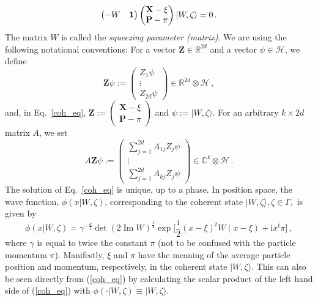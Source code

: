 \documentclass[11pt]{article}
\renewcommand{\Im}{\operatorname{Im}}
\newcommand{\iu}{{\mathrm i}}
\newcommand{\id}{\mathrm{id}}
\begin{document}
\begin{equation}\label{coh_eq}
\begin{pmatrix}
-W & {\bf{1}} \end{pmatrix}
\begin{pmatrix}
\mathbf{X}  -\xi \\
\mathbf{P}  -\pi \end{pmatrix} \vert W, \zeta \rangle = 0\,.
\end{equation}
The matrix $W$ is called the \textit{squeezing parameter (matrix)}. We are using the following notational conventions: For a vector $\mathbf{Z} \in \mathbb{R}^{2d}$ and a vector $\psi \in \mathcal{H}$, we
define 
$$\mathbf{Z} \psi:= \begin{pmatrix} Z_1 \psi \\ \vdots \\ Z_{2d} \psi \end{pmatrix} \in \mathbb{R}^{2d} \otimes \mathcal{H}\,,$$
and, in Eq.~\eqref{coh_eq}, $\mathbf{Z} := \begin{pmatrix} \mathbf{X}-\xi \\ \mathbf{P}- \pi \end{pmatrix}$ and 
$\psi:= \vert W, \zeta\rangle$. For an arbitrary $k\times 2d$ matrix $A$, we set
$$A \mathbf{Z} \psi:= \begin{pmatrix} \sum_{j=1}^{2d} A_{1j} Z_j \psi \\ \vdots \\ \sum_{j=1}^{2d} A_{kj} Z_j \psi \end{pmatrix} \in \mathbb{C}^{k} \otimes \mathcal{H}\,.$$
The solution of Eq.~\eqref{coh_eq} is unique, up to a phase. In position space, the wave function, $\phi(x \vert W, \zeta)$, corresponding to the coherent state $\vert W, \zeta \rangle, \zeta \in \Gamma,$ is given by
\begin{equation}\label{S_repr}
\phi(x \vert W, \zeta) = \gamma^{-\frac d4}\det(2\Im W)^{\frac{1}{4}} \exp\big[ \frac{\iu}{2} (x - \xi)^t W (x - \xi) + \iu x^t \pi\big]\,,
\end{equation}
where $\gamma$ is equal to twice the constant $\pi$ (not to be confused with the particle momentum $\pi$). Manifestly, 
$\xi$ and $\pi$ have the meaning of the average particle position and momentum, respectively, in the coherent state 
$\vert W, \zeta \rangle$. This can also be seen directly from (\ref{coh_eq}) by calculating the scalar product of the 
left hand side of (\ref{coh_eq}) with $\phi(\cdot \vert W, \zeta)\equiv \vert W, \zeta \rangle$.
\end{document}

